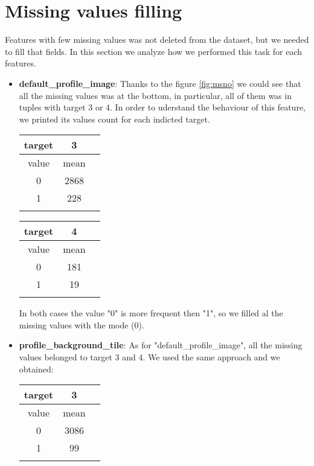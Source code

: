 \section{Missing values filling}
Features with few missing values was not deleted from the dataset, but we needed to fill that fields.
In this section we analyze how we performed this task for each features.
\begin{itemize}
	\item[\PencilRight]\textbf{default\_profile\_image}: Thanks to the figure \ref{fig:msno} we could see that all the missing values was at the bottom, in particular, all of them was in tuples with target 3 or 4. In order to uderstand the behaviour of this feature, we printed its values count for each indicted target.
	\begin{center}
		\begin{tabular}{ccc}
			\\target&3\\
			\hline\hline
			value&mean\\
			\hline\hline
			0&2868\\
			1&228\\\hline\\
		\end{tabular}
		
		\begin{tabular}{ccc}
			\\target&4\\
			\hline\hline
			value&mean\\
			\hline\hline
			0&181\\
			1&19\\\hline\\
		\end{tabular}
	\end{center}
	
	In both cases the value "0" is more frequent then "1", so we filled al the missing values with the mode (0).
	
	\item[\PencilRight]\textbf{profile\_background\_tile}: As for "default\_profile\_image", all the missing values belonged to target 3 and 4. We used the same approach and we obtained:
	\begin{center}
		\begin{tabular}{ccc}
			\\target&3\\
			\hline\hline
			value&mean\\
			\hline\hline
			0&3086\\
			1&99\\\hline\\
		\end{tabular}
		

\end{center}
\end{itemize}
